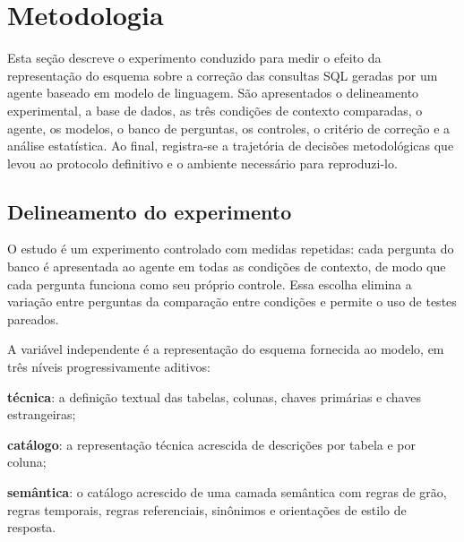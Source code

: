 \chapter{Metodologia}
\label{cap:metodologia}

Esta seção descreve o experimento conduzido para medir o efeito da
representação do esquema sobre a correção das consultas SQL geradas por um
agente baseado em modelo de linguagem. São apresentados o delineamento
experimental, a base de dados, as três condições de contexto comparadas, o
agente, os modelos, o banco de perguntas, os controles, o critério de
correção e a análise estatística. Ao final, registra-se a trajetória de
decisões metodológicas que levou ao protocolo definitivo e o ambiente
necessário para reproduzi-lo.

\section{Delineamento do experimento}
\label{sec:delineamento}

O estudo é um experimento controlado com medidas repetidas: cada pergunta do
banco é apresentada ao agente em todas as condições de contexto, de modo que
cada pergunta funciona como seu próprio controle. Essa escolha elimina a
variação entre perguntas da comparação entre condições e permite o uso de
testes pareados.

A variável independente é a representação do esquema fornecida ao modelo,
em três níveis progressivamente aditivos:
\begin{alineas}
  \item \textbf{técnica}: a definição textual das tabelas, colunas, chaves
        primárias e chaves estrangeiras;
  \item \textbf{catálogo}: a representação técnica acrescida de descrições
        por tabela e por coluna;
  \item \textbf{semântica}: o catálogo acrescido de uma camada semântica com
        regras de grão, regras temporais, regras referenciais, sinônimos e
        orientações de estilo de resposta.
\end{alineas}

